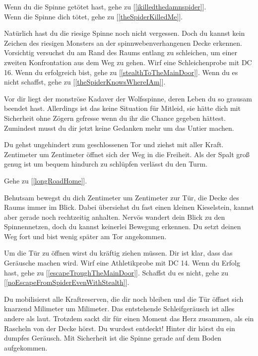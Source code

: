 
Wenn du die Spinne getötet hast, gehe zu [\ref{ikilledthedamnspider}].
\\Wenn die Spinne dich tötet, gehe zu [\ref{theSpiderKilledMe}].


Natürlich hast du die riesige Spinne noch nicht vergessen. Doch du kannst kein Zeichen des riesigen Monsters an der spinnwebenverhangenen Decke erkennen. Vorsichtig versuchst du am Rand des Raums entlang zu schleichen, um einer zweiten Konfrontation aus dem Weg zu gehen. Wirf eine Schleichenprobe mit DC 16. Wenn du erfolgreich bist, gehe zu [\ref{stealthToTheMainDoor}].
Wenn du es nicht schaffst, gehe zu [\ref{theSpiderKnowsWhereIAm}].


Vor dir liegt der monströse Kadaver der Wolfsspinne, deren Leben du so grausam beendet hast. Allerdings ist das keine Situation für Mitleid, sie hätte dich mit Sicherheit ohne Zögern gefresse wenn du ihr die Chance gegeben hättest. Zumindest musst du dir jetzt keine Gedanken mehr um das Untier machen.

Du gehst ungehindert zum geschlossenen Tor und ziehst mit aller Kraft. Zentimeter um Zentimeter öffnet sich der Weg in die Freiheit. Als der Spalt groß genug ist um bequem hindurch zu schlüpfen verlässt du den Turm.

Gehe zu [\ref{longRoadHome}].


Behutsam bewegst du dich Zentimeter um Zentimeter zur Tür, die Decke des Raums immer im Blick. Dabei übersiehst du fast einen kleinen Kieselstein, kannst aber gerade noch rechtzeitig anhalten. Nervös wandert dein Blick zu den Spinnennetzen, doch du kannst keinerlei Bewegung erkennen.
Du setzt deinen Weg fort und bist wenig später am Tor angekommen.

Um die Tür zu öffnen wirst du kräftig ziehen müssen. Dir ist klar, dass das Geräusche machen wird. Wirf eine Athletikprobe mit DC 14. Wenn du Erfolg hast, gehe zu [\ref{escapeTroughTheMainDoor}]. Schaffst du es nicht, gehe zu [\ref{noEscapeFromSpiderEvenWithStealth}].


Du mobilisierst alle Kraftreserven, die dir noch bleiben und die Tür öffnet sich knarzend Milimeter um Milimeter. Das entstehende Schleifgeräusch ist alles andere als laut. Trotzdem sackt dir für einen Moment das Herz zusammen, als ein Rascheln von der Decke hörst. Du wurdest entdeckt! Hinter dir hörst du ein dumpfes Geräusch. Mit Sicherheit ist die Spinne gerade auf dem Boden aufgekommen.

